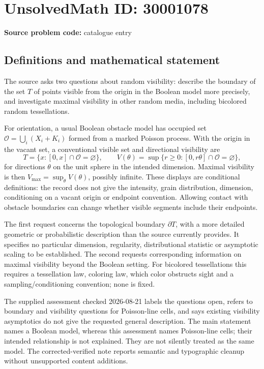 \documentclass[11pt]{article}
\begin{document}
\section*{UnsolvedMath ID: 30001078}
\textbf{Source problem code:} catalogue entry
\subsection{Definitions and mathematical statement}
The source asks two questions about random visibility: describe the boundary of the set $T$ of points visible from the origin in the Boolean model more precisely, and investigate maximal visibility in other random media, including bicolored random tessellations.

For orientation, a usual Boolean obstacle model has occupied set $\mathcal O=\bigcup_i(X_i+K_i)$ formed from a marked Poisson process. With the origin in the vacant set, a conventional visible set and directional visibility are
\[
T=\{x:[0,x]\cap\mathcal O=\varnothing\},\qquad
V(\theta)=\sup\{r\geq0:[0,r\theta]\cap\mathcal O=\varnothing\},
\]
for directions $\theta$ on the unit sphere in the intended dimension. Maximal visibility is then $V_{\max}=\sup_\theta V(\theta)$, possibly infinite. These displays are conditional definitions: the record does not give the intensity, grain distribution, dimension, conditioning on a vacant origin or endpoint convention. Allowing contact with obstacle boundaries can change whether visible segments include their endpoints.

The first request concerns the topological boundary $\partial T$, with a more detailed geometric or probabilistic description than the source currently provides. It specifies no particular dimension, regularity, distributional statistic or asymptotic scaling to be established. The second requests corresponding information on maximal visibility beyond the Boolean setting. For bicolored tessellations this requires a tessellation law, coloring law, which color obstructs sight and a sampling/conditioning convention; none is fixed.

The supplied assessment checked 2026-08-21 labels the questions open, refers to boundary and visibility questions for Poisson-line cells, and says existing visibility asymptotics do not give the requested general description. The main statement names a Boolean model, whereas this assessment names Poisson-line cells; their intended relationship is not explained. They are not silently treated as the same model. The corrected-verified note reports semantic and typographic cleanup without unsupported content additions.
\end{document}
